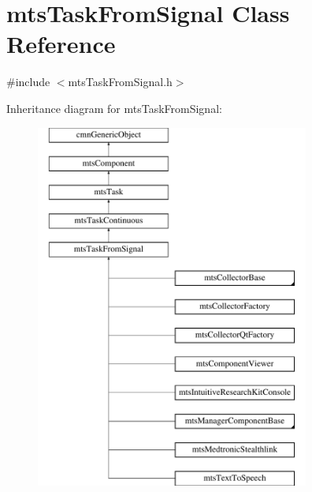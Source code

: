 \hypertarget{classmts_task_from_signal}{}\section{mts\+Task\+From\+Signal Class Reference}
\label{classmts_task_from_signal}


{\ttfamily \#include $<$mts\+Task\+From\+Signal.\+h$>$}

Inheritance diagram for mts\+Task\+From\+Signal\+:\begin{figure}[H]
\begin{center}
\leavevmode
\includegraphics[height=12.000000cm]{de/d71/classmts_task_from_signal}
\end{center}
\end{figure}
